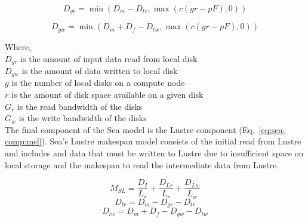 \documentclass[10pt,journal,compsoc]{IEEEtran}
\begin{document}
      \begin{equation*}\label{eq:sea-comp:ddr}
          D_{gr} = \min{(D_{m} - D_{tr}, \max{(c(gr - pF),0)})}
      \end{equation*}

      \begin{equation*}\label{eq:sea-comp:ddw}
          D_{gw} = \min{(D_{m} + D_{f} - D_{tw}, \max{(c(gr - pF),0)})}
      \end{equation*}

      
      Where, \\
      $D_{gr}$ is the amount of input data read from local disk \\
      $D_{gw}$ is the amount of data written to local disk \\
      $g$ is the number of local disks on a compute node \\
      $r$ is the amount of disk space available on a given disk \\
      $G_{r}$ is the read bandwidth of the disks \\
      $G_{w}$ is the write bandwidth of the disks \\

      The final component of the Sea model is the Lustre component
      (Eq.~\ref{eq:sea-comp:msl}). Sea's Lustre makespan model consists of the
      initial read from Lustre and includes and data that must be written to
      Lustre due to insufficient space on local storage and the makespan to read
      the intermediate data from Lustre.

      \begin{equation}\label{eq:sea-comp:msl}
          M_{SL} = \frac{D_{I}}{L_{r}} + \frac{D_{Lr}}{L_{r}} + \frac{D_{Lw}}{L_{w}}
      \end{equation}
      \begin{equation*}\label{eq:sea-comp:dlr}
          D_{lr} = D_{m} - D_{gr} - D_{tr}
      \end{equation*}
      \begin{equation*}\label{eq:sea-comp:dlw}
          D_{lw} = D_{m} + D_{f} - D_{gw} - D_{tw}
      \end{equation*}
\end{document}
